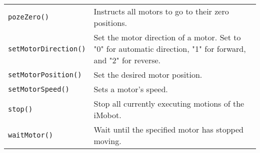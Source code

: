\begin{table}[!hp]
\begin{center}
\begin{tabular}{p{38 mm}p{77 mm}}
\texttt{pozeZero()} \dotfill & Instructs all motors to go to their zero positions. \\
\texttt{setMotorDirection()} \dotfill & Set the motor direction of a motor. Set
to "0" for automatic direction, "1" for forward, and "2" for reverse. \\
\texttt{setMotorPosition()} \dotfill & Set the desired motor position. \\
\texttt{setMotorSpeed()} \dotfill & Sets a motor's speed. \\
\texttt{stop()} \dotfill & Stop all currently executing motions of the iMobot. \\
\texttt{waitMotor()} \dotfill & Wait until the specified motor has stopped moving. \\
\hline
\end{tabular}
\end{center}
\label{mobilec_api_cbinary}
\end{table}

\newpage

\pagebreak

\pagebreak

\pagebreak

\pagebreak

\pagebreak

\pagebreak

\pagebreak

\pagebreak

\pagebreak

\pagebreak

\pagebreak

\pagebreak

\pagebreak

\pagebreak

